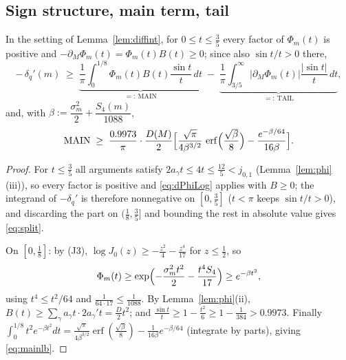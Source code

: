 \subsection*{Sign structure, main term, tail}

\begin{lemma}
\label{lem:negstruct}
In the setting of Lemma~\ref{lem:diffint}, for $0\le t\le\tfrac35$
every factor of $\Phi_m(t)$ is positive and
$-\partial_M\Phi_m(t)=\Phi_m(t)B(t)\ge0$; since also
$\sin t/t>0$ there,
\begin{equation}\label{eq:split}
-\,\delta_q'(m)\;\ge\;
\underbrace{\frac1\pi\int_0^{1/8}\Phi_m(t)B(t)\frac{\sin t}t\,dt}
_{=:\ \mathrm{MAIN}}
\;-\;
\underbrace{\frac1\pi\int_{3/5}^{\infty}\bigl|\partial_M\Phi_m(t)\bigr|
\frac{|\sin t|}t\,dt}_{=:\ \mathrm{TAIL}} ,
\end{equation}
and, with $\beta:=\dfrac{\sigma_m^2}2+\dfrac{S_4(m)}{1088}$,
\begin{equation}\label{eq:mainlb}
\mathrm{MAIN}\;\ge\;\frac{0.9973}{\pi}\cdot\frac{D(M)}2
\Bigl[\frac{\sqrt\pi}{4\beta^{3/2}}\,
\operatorname{erf}\Bigl(\frac{\sqrt\beta}8\Bigr)
-\frac{e^{-\beta/64}}{16\beta}\Bigr].
\end{equation}
\end{lemma}

\begin{proof}
For $t\le\tfrac35$ all arguments satisfy
$2a_\gamma t\le4t\le\tfrac{12}5<j_{0,1}$
(Lemma~\ref{lem:phi}(iii)), so every factor is positive and
\eqref{eq:dPhiLog} applies with $B\ge0$; the integrand of
$-\delta_q'$ is therefore nonnegative on $[0,\tfrac35]$
($t<\pi$ keeps $\sin t/t>0$), and discarding the part on
$(\tfrac18,\tfrac35]$ and bounding the rest in absolute value gives
\eqref{eq:split}.

On $[0,\tfrac18]$: by (J3),
$\log J_0(z)\ge-\tfrac{z^2}4-\tfrac{z^4}{17}$ for $z\le\tfrac12$, so
\[
\Phi_m(t)\ge\exp\Bigl(-\frac{\sigma_m^2t^2}2-\frac{t^4S_4}{17}\Bigr)
\ge e^{-\beta t^2},
\]
using $t^4\le t^2/64$ and $\tfrac1{64\cdot17}\le\tfrac1{1088}$. By
Lemma~\ref{lem:phi}(ii), $B(t)\ge\sum_\gamma a_\gamma t\cdot
2a_\gamma't=\tfrac D2t^2$; and $\tfrac{\sin t}t\ge1-\tfrac{t^2}6
\ge1-\tfrac1{384}>0.9973$. Finally
$\int_0^{1/8}t^2e^{-\beta t^2}dt
=\frac{\sqrt\pi}{4\beta^{3/2}}\operatorname{erf}(\tfrac{\sqrt\beta}8)
-\frac1{16\beta}e^{-\beta/64}$ (integrate by parts), giving
\eqref{eq:mainlb}.
\end{proof}

